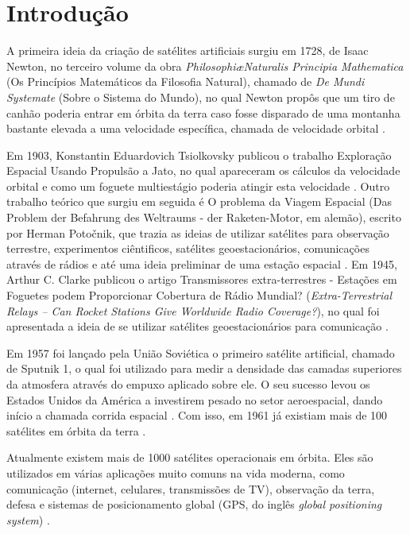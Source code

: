 \chapter{Introdução}

A primeira ideia da criação de satélites artificiais surgiu em 1728, de Isaac Newton, no terceiro volume da obra \textit{Philosophi\ae Naturalis Principia Mathematica} (Os Princípios Matemáticos da Filosofia Natural), chamado de \textit{De Mundi Systemate} (Sobre o Sistema do Mundo), no qual Newton propôs que um tiro de canhão poderia entrar em órbita da terra caso fosse disparado de uma montanha bastante elevada a uma velocidade específica, chamada de velocidade orbital \cite{DeMundiSystemate}.

Em 1903, Konstantin Eduardovich Tsiolkovsky publicou o trabalho Exploração Espacial Usando Propulsão a Jato, no qual apareceram os cálculos da velocidade orbital e como um foguete multiestágio poderia atingir esta velocidade \cite{rocketEquation}. Outro trabalho teórico que surgiu em seguida é O problema da Viagem Espacial (Das Problem der Befahrung des Weltraums - der Raketen-Motor, em alemão), escrito por Herman Poto\v{c}nik, que trazia as ideias de utilizar satélites para observação terrestre, experimentos ciêntificos, satélites geoestacionários, comunicações através de rádios e até uma ideia preliminar de uma estação espacial \cite{theProblemOfSpaceTravel}. Em 1945, Arthur C. Clarke publicou o artigo Transmissores extra-terrestres - Estações em Foguetes podem Proporcionar Cobertura de Rádio Mundial? (\textit{Extra-Terrestrial Relays – Can Rocket Stations Give Worldwide Radio Coverage?}), no qual foi apresentada a ideia de se utilizar satélites geoestacionários para comunicação \cite{extraTerrestrialRelays}.

Em 1957 foi lançado pela União Soviética o primeiro satélite artificial, chamado de Sputnik 1, o qual foi utilizado para medir a densidade das camadas superiores da atmosfera através do empuxo aplicado sobre ele. O seu sucesso levou os Estados Unidos da América a investirem pesado no setor aeroespacial, dando início a chamada corrida espacial \cite{SputnikReconsidered}. Com isso, em 1961 já existiam mais de 100 satélites em órbita da terra \cite{orbitalDebrisChronology}.

Atualmente existem mais de 1000 satélites operacionais em órbita. Eles são utilizados em várias aplicações muito comuns na vida moderna, como comunicação (internet, celulares, transmissões de TV), observação da terra, defesa e sistemas de posicionamento global (GPS, do inglês \textit{global positioning system}) \cite{satelliteHitsAtlantic}.


